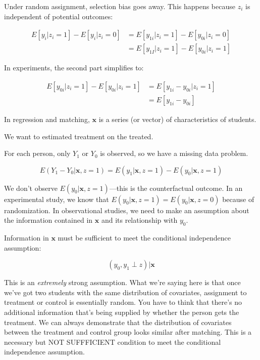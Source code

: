 \documentclass[12pt]{article}
\newcommand{\boldx}{\boldsymbol{x}}
\begin{document}
Under random assignment, selection bias goes away. This happens
because $z_i$ is independent of potential outcomes:

\begin{align*}
  E[y_i|z_i=1]-E[y_i|z_i=0]&=E[y_{1i}|z_i=1]-E[y_{0i}|z_i=0]\\
                           &=E[y_{1I}|z_i=1]-E[y_{0i}|z_i=1]
\end{align*}

In experiments, the second part simplifies to: 

\begin{align*}
E[y_{0i}|z_i=1]-E[y_{0i}|z_i=1]&=E[y_{1i}-y_{0i}|z_i=1] \\
                               &=E[y_{1i}-y_{0i}]
\end{align*}

In regression and matching, $\boldx$ is  a series (or vector) of characteristics of students. 

We want to estimated treatment on the treated.

For each person, only $Y_1$ or $Y_0$ is observed, so we have a missing
data problem. 

\begin{equation*}
E(Y_1-Y_0|\boldx,z=1)=E(y_1|\boldx,z=1)-E(y_0|\boldx,z=1)
\end{equation*}

We don't observe $E(y_0|\boldx,z=1)$---this is the counterfactual
outcome. In an experimental study, we know that
$E(y_0|\boldx,z=1)=E(y_0|\boldx,z=0)$ because of randomization. In
observational studies, we need to make an assumption about the
information contained in $\boldx$ and its relationship with $y_0$. 

Information in $\boldx$ must be sufficient to meet the conditional independence assumption:

\begin{equation*}
(y_0, y_1\perp z)|\boldx
\end{equation*}

This is an \textit{extremely} strong assumption. What we're saying
here is that once we've got two students with the same distribution of
covariates, assignment to treatment or control is essentially
random. You have to think that there's no additional information that's
being supplied by whether the person gets the treatment. We can always
demonstrate that the distribution of covariates between the treatment
and control group looks similar after matching. This is a necessary
but NOT SUFFFICIENT condition to meet the conditional independence
assumption. 
\end{document}
